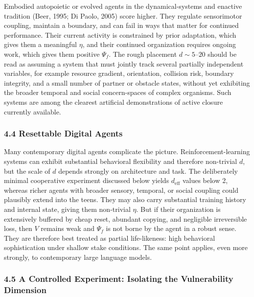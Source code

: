 \documentclass[Afour,sageh,times,doublespace]{sagej}
\begin{document}
Embodied autopoietic or evolved agents in the dynamical-systems and enactive tradition (Beer, 1995; Di Paolo, 2005) score higher. They regulate sensorimotor coupling, maintain a boundary, and can fail in ways that matter for continued performance. Their current activity is constrained by prior adaptation, which gives them a meaningful \(\eta\), and their continued organization requires ongoing work, which gives them positive \(\Psi_f\). The rough placement \(d \sim 5\text{--}20\) should be read as assuming a system that must jointly track several partially independent variables, for example resource gradient, orientation, collision risk, boundary integrity, and a small number of partner or obstacle states, without yet exhibiting the broader temporal and social concern-spaces of complex organisms. Such systems are among the clearest artificial demonstrations of active closure currently available.

\subsubsection{4.4 Resettable Digital Agents}\label{resettable-digital-agents}

Many contemporary digital agents complicate the picture. Reinforcement-learning systems can exhibit substantial behavioral flexibility and therefore non-trivial \(d\), but the scale of \(d\) depends strongly on architecture and task. The deliberately minimal cooperative experiment discussed below yields \(d_{\mathrm{eff}}\) values below 2, whereas richer agents with broader sensory, temporal, or social coupling could plausibly extend into the teens. They may also carry substantial training history and internal state, giving them non-trivial \(\eta\). But if their organization is extensively buffered by cheap reset, abundant copying, and negligible irreversible loss, then \(V\) remains weak and \(\Psi_f\) is not borne by the agent in a robust sense. They are therefore best treated as partial life-likeness: high behavioral sophistication under shallow stake conditions. The same point applies, even more strongly, to contemporary large language models.

\subsubsection{4.5 A Controlled Experiment: Isolating the Vulnerability Dimension}\label{a-controlled-experiment-isolating-the-vulnerability-dimension}
\end{document}
